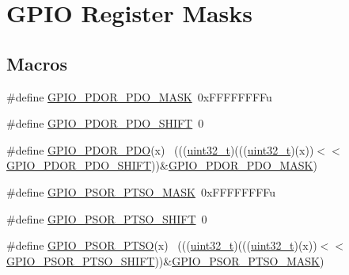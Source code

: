 \hypertarget{group___g_p_i_o___register___masks}{}\section{G\+P\+IO Register Masks}
\label{group___g_p_i_o___register___masks}
\subsection*{Macros}
\begin{DoxyCompactItemize}
\item 
\#define \hyperlink{group___g_p_i_o___register___masks_gafd2a8274691295293b3cabfe86089801}{G\+P\+I\+O\+\_\+\+P\+D\+O\+R\+\_\+\+P\+D\+O\+\_\+\+M\+A\+SK}~0x\+F\+F\+F\+F\+F\+F\+F\+Fu
\item 
\#define \hyperlink{group___g_p_i_o___register___masks_ga495b5f1e63de863534ce0c5f25f137ab}{G\+P\+I\+O\+\_\+\+P\+D\+O\+R\+\_\+\+P\+D\+O\+\_\+\+S\+H\+I\+FT}~0
\item 
\#define \hyperlink{group___g_p_i_o___register___masks_ga79d6ac6995e51c108cc38b287e688f0d}{G\+P\+I\+O\+\_\+\+P\+D\+O\+R\+\_\+\+P\+DO}(x)                                              ~(((\hyperlink{_p_e___types_8h_a33594304e786b158f3fb30289278f5af}{uint32\+\_\+t})(((\hyperlink{_p_e___types_8h_a33594304e786b158f3fb30289278f5af}{uint32\+\_\+t})(x))$<$$<$\hyperlink{group___g_p_i_o___register___masks_ga495b5f1e63de863534ce0c5f25f137ab}{G\+P\+I\+O\+\_\+\+P\+D\+O\+R\+\_\+\+P\+D\+O\+\_\+\+S\+H\+I\+FT}))\&\hyperlink{group___g_p_i_o___register___masks_gafd2a8274691295293b3cabfe86089801}{G\+P\+I\+O\+\_\+\+P\+D\+O\+R\+\_\+\+P\+D\+O\+\_\+\+M\+A\+SK})
\item 
\#define \hyperlink{group___g_p_i_o___register___masks_gaa8a48e38ef70ff1ba3bbcbf31b891da4}{G\+P\+I\+O\+\_\+\+P\+S\+O\+R\+\_\+\+P\+T\+S\+O\+\_\+\+M\+A\+SK}~0x\+F\+F\+F\+F\+F\+F\+F\+Fu
\item 
\#define \hyperlink{group___g_p_i_o___register___masks_ga5a962b85e07477e26afe639c7ca478cb}{G\+P\+I\+O\+\_\+\+P\+S\+O\+R\+\_\+\+P\+T\+S\+O\+\_\+\+S\+H\+I\+FT}~0
\item 
\#define \hyperlink{group___g_p_i_o___register___masks_gafea75a81df86bdc27b57b045f71a7866}{G\+P\+I\+O\+\_\+\+P\+S\+O\+R\+\_\+\+P\+T\+SO}(x)                                            ~(((\hyperlink{_p_e___types_8h_a33594304e786b158f3fb30289278f5af}{uint32\+\_\+t})(((\hyperlink{_p_e___types_8h_a33594304e786b158f3fb30289278f5af}{uint32\+\_\+t})(x))$<$$<$\hyperlink{group___g_p_i_o___register___masks_ga5a962b85e07477e26afe639c7ca478cb}{G\+P\+I\+O\+\_\+\+P\+S\+O\+R\+\_\+\+P\+T\+S\+O\+\_\+\+S\+H\+I\+FT}))\&\hyperlink{group___g_p_i_o___register___masks_gaa8a48e38ef70ff1ba3bbcbf31b891da4}{G\+P\+I\+O\+\_\+\+P\+S\+O\+R\+\_\+\+P\+T\+S\+O\+\_\+\+M\+A\+SK})

\end{DoxyCompactItemize}
